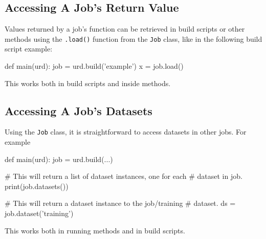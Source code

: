 \subsection{Accessing A Job's Return Value}
Values returned by a job's \synthesis function can be retrieved in
build scripts or other methods using the \texttt{.load()} function
from the \texttt{Job} class, like in the following build script
example:
\begin{python}
def main(urd):
    job = urd.build('example')
    x = job.load()
\end{python}
This works both in build scripts and inside methods.


\subsection{Accessing A Job's Datasets}
Using the \texttt{Job} class, it is straightforward to access datasets
in other jobs.  For example
\begin{python}
def main(urd):
    job = urd.build(...)

    # This will return a list of dataset instances, one for each
    # dataset in job.
    print(job.datasets())

    # This will return a dataset instance to the job/training
    # dataset.
    ds = job.dataset('training')
\end{python}
This works both in running methods and in build scripts.


